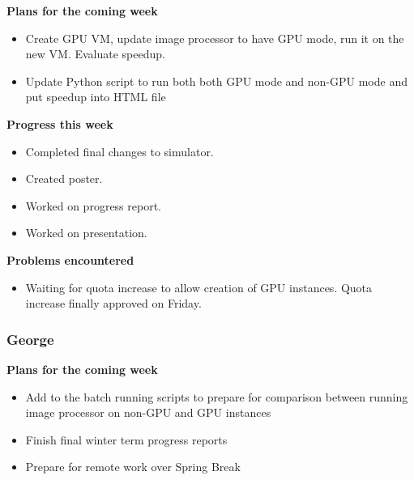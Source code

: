 \documentclass[10pt, onecolumn, draftclsnofoot, letterpaper, compsoc]{IEEEtran}
\begin{document}
    \noindent \textbf{Plans for the coming week}

    \begin{itemize}

    \item Create GPU VM, update image processor to have GPU mode, run it on the new VM. Evaluate speedup.
    \item Update Python script to run both both GPU mode and non-GPU mode and put speedup into HTML file

    \end{itemize}

    \noindent \textbf{Progress this week}

    \begin{itemize}

    \item Completed final changes to simulator.
    \item Created poster.
    \item Worked on progress report.
    \item Worked on presentation.

    \end{itemize}

    \noindent \textbf{Problems encountered}

    \begin{itemize}

    \item Waiting for quota increase to allow creation of GPU instances. Quota increase finally approved on Friday.

    \end{itemize}

    \subsubsection{George}

    \noindent \textbf{Plans for the coming week}

    \begin{itemize}

    \item Add to the batch running scripts to prepare for comparison between running image processor on non-GPU and GPU instances
    \item Finish final winter term progress reports
    \item Prepare for remote work over Spring Break

    \end{itemize}
\end{document}
